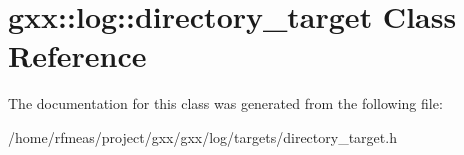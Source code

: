 \hypertarget{classgxx_1_1log_1_1directory__target}{}\section{gxx\+:\+:log\+:\+:directory\+\_\+target Class Reference}
\label{classgxx_1_1log_1_1directory__target}


The documentation for this class was generated from the following file\+:\begin{DoxyCompactItemize}
\item 
/home/rfmeas/project/gxx/gxx/log/targets/directory\+\_\+target.\+h\end{DoxyCompactItemize}
